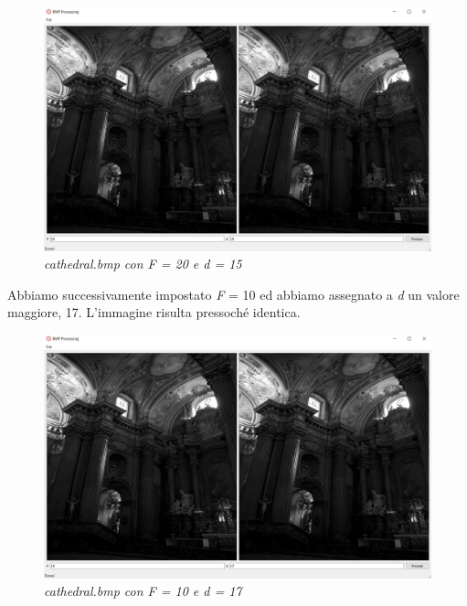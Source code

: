 \documentclass[a4paper,12pt]{report}
\begin{document}
\begin{figure}[H]
\centering
\includegraphics[width=0.8\linewidth]{../img/cathedral_20_15.png}
\caption{\textit{cathedral.bmp con F = 20 e d = 15}}
\end{figure}

Abbiamo successivamente impostato \textit{F} = 10 ed abbiamo assegnato a \textit{d} un valore maggiore, 17. L'immagine risulta pressoché identica.

\begin{figure}[H]
\centering
\includegraphics[width=0.8\linewidth]{../img/cathedral_10_17.png}
\caption{\textit{cathedral.bmp con F = 10 e d = 17}}
\end{figure}

\printbibliography
\end{document}
